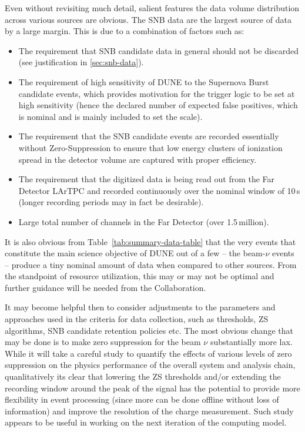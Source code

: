 Even without revisiting much detail, salient features the data volume distribution across various sources are
obvious. The SNB data are the largest source of data by a large margin. This is due to a combination of factors such as:
\begin{itemize}

\item The requirement that SNB candidate data in general should not be discarded (see justification in \ref{sec:snb-data}).

\item The requirement of high sensitivity of DUNE to the Supernova Burst candidate events, which provides motivation
for the trigger logic to be set at high sensitivity (hence the declared number of expected false positives, which is nominal
and is mainly included to set the scale).

\item The requirement that the SNB candidate events are recorded essentially without Zero-Suppression to ensure that low energy
clusters of ionization spread in the detector volume are captured with proper efficiency.

\item The requirement that the digitized data is being read out from the Far Detector LArTPC and recorded continuously over
the nominal window of 10\,s (longer recording periods may in fact be desirable).

\item Large total number of channels in the Far Detector (over 1.5\,million).

\end{itemize}

\noindent
It is also obvious from Table~\ref{tab:summary-data-table} that the very events that constitute the main science objective of DUNE
out of a few -- the beam-$\nu$ events -- produce a tiny nominal amount of data when compared to other sources. From the standpoint
of resource utilization, this may or may not be optimal and further guidance will be needed from the Collaboration.

It may become helpful then to consider adjustments to the parameters and approaches used in the criteria for data collection, such as
thresholds, ZS algorithms, SNB candidate retention policies etc. The most obvious change that may be done is to make zero suppression
for the beam $\nu$ substantially more lax. While it will take a careful study to quantify the effects of various levels of zero suppression
on the physics performance of the overall system and analysis chain, quanlitatively its clear that lowering the ZS thresholds and/or
extending the recording window around the peak of the signal has the potential to provide more flexibility in event processing (since
more can be done offline without loss of information) and improve the resolution of the charge measurement. Such study appears to
be useful in working on the next iteration of the computing model.

